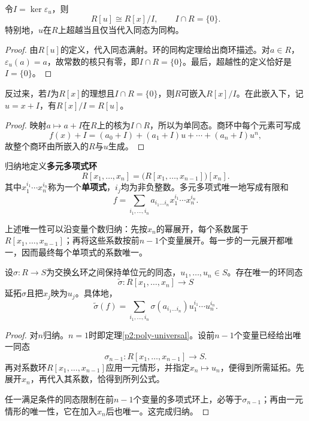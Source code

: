 \begin{corollary}
令$I=\ker\varepsilon_u$，则
\[
R[u]\cong R[x]/I,\qquad I\cap R=\{0\}.
\]
特别地，$u$在$R$上超越当且仅当代入同态为同构。
\end{corollary}
\begin{proof}
由$R[u]$的定义，代入同态满射。环的同构定理给出商环描述。对$a\in R$，$\varepsilon_u(a)=a$，故常数的核只有零，即$I\cap R=\{0\}$。最后，超越性的定义恰好是$I=\{0\}$。
\end{proof}

\begin{proposition}
反过来，若$I$为$R[x]$的理想且$I\cap R=\{0\}$，则$R$可嵌入$R[x]/I$。在此嵌入下，记$u=x+I$，有$R[x]/I=R[u]$。
\end{proposition}
\begin{proof}
映射$a\mapsto a+I$在$R$上的核为$I\cap R$，所以为单同态。商环中每个元素可写成
\[
f(x)+I=(a_0+I)+(a_1+I)u+\cdots+(a_n+I)u^n,
\]
故整个商环由所嵌入的$R$与$u$生成。
\end{proof}

\begin{definition}
归纳地定义\textbf{多元多项式环}
\[
R[x_1,\ldots,x_n]=\bigl(R[x_1,\ldots,x_{n-1}]\bigr)[x_n].
\]
其中$x_1^{i_1}\cdots x_n^{i_n}$称为一个\textbf{单项式}，$i_j$均为非负整数。多元多项式唯一地写成有限和
\[
f=\sum_{i_1,\ldots,i_n}a_{i_1\ldots i_n}x_1^{i_1}\cdots x_n^{i_n}.
\]
\end{definition}

上述唯一性可以沿变量个数归纳：先按$x_n$的幂展开，每个系数属于$R[x_1,\ldots,x_{n-1}]$；再将这些系数按前$n-1$个变量展开。每一步的一元展开都唯一，因而最终每个单项式的系数唯一。

\begin{theorem}\label{p2:multi-poly-universal}
设$\sigma:R\to S$为交换幺环之间保持单位元的同态，$u_1,\ldots,u_n\in S$。存在唯一的环同态
\[
\widetilde\sigma:R[x_1,\ldots,x_n]\to S
\]
延拓$\sigma$且把$x_j$映为$u_j$。具体地，
\[
\widetilde\sigma(f)=
\sum_{i_1,\ldots,i_n}\sigma(a_{i_1\ldots i_n})
u_1^{i_1}\cdots u_n^{i_n}.
\]
\end{theorem}
\begin{proof}
对$n$归纳。$n=1$时即定理\ref{p2:poly-universal}。设前$n-1$个变量已经给出唯一同态
\[
\sigma_{n-1}:R[x_1,\ldots,x_{n-1}]\to S.
\]
再对系数环$R[x_1,\ldots,x_{n-1}]$应用一元情形，并指定$x_n\mapsto u_n$，便得到所需延拓。先展开$x_n$，再代入其系数，恰得到所列公式。

任一满足条件的同态限制在前$n-1$个变量的多项式环上，必等于$\sigma_{n-1}$；再由一元情形的唯一性，它在加入$x_n$后也唯一。这完成归纳。
\end{proof}

